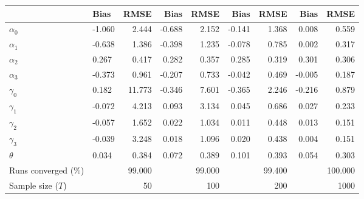 
\begin{tabular}[t]{llrrrrrrr}
\toprule
  & Bias & RMSE & Bias & RMSE & Bias & RMSE & Bias & RMSE\\
\midrule
$\alpha_{0}$ & -1.060 & 2.444 & -0.688 & 2.152 & -0.141 & 1.368 & 0.008 & 0.559\\
$\alpha_{1}$ & -0.638 & 1.386 & -0.398 & 1.235 & -0.078 & 0.785 & 0.002 & 0.317\\
$\alpha_{2}$ & 0.267 & 0.417 & 0.282 & 0.357 & 0.285 & 0.319 & 0.301 & 0.306\\
$\alpha_{3}$ & -0.373 & 0.961 & -0.207 & 0.733 & -0.042 & 0.469 & -0.005 & 0.187\\
$\gamma_{0}$ & 0.182 & 11.773 & -0.346 & 7.601 & -0.365 & 2.246 & -0.216 & 0.879\\
$\gamma_{1}$ & -0.072 & 4.213 & 0.093 & 3.134 & 0.045 & 0.686 & 0.027 & 0.233\\
$\gamma_{2}$ & -0.057 & 1.652 & 0.022 & 1.034 & 0.011 & 0.448 & 0.013 & 0.151\\
$\gamma_{3}$ & -0.039 & 3.248 & 0.018 & 1.096 & 0.020 & 0.438 & 0.004 & 0.151\\
$\theta$ & 0.034 & 0.384 & 0.072 & 0.389 & 0.101 & 0.393 & 0.054 & 0.303\\
Runs converged (\%) &  & 99.000 &  & 99.000 &  & 99.400 &  & 100.000\\
Sample size ($T$) &  & 50 &  & 100 &  & 200 &  & 1000\\
\bottomrule
\end{tabular}
